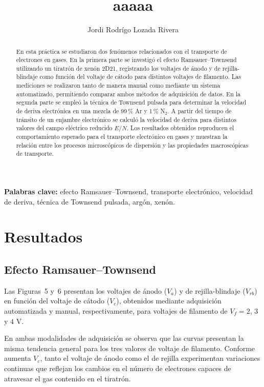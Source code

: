 \documentclass{article}
\title{aaaaa}
\author{Jordi Rodrígo Lozada Rivera}
\begin{document}
\begin{abstract}
En esta práctica se estudiaron dos fenómenos relacionados con el transporte de electrones en gases. En la primera parte se investigó el efecto Ramsauer--Townsend utilizando un tiratrón de xenón 2D21, registrando los voltajes de ánodo y de rejilla-blindaje como función del voltaje de cátodo para distintos voltajes de filamento. Las mediciones se realizaron tanto de manera manual como mediante un sistema automatizado, permitiendo comparar ambos métodos de adquisición de datos. En la segunda parte se empleó la técnica de Townsend pulsada para determinar la velocidad de deriva electrónica en una mezcla de 99\,\% Ar y 1\,\% N$_2$. A partir del tiempo de tránsito de un enjambre electrónico se calculó la velocidad de deriva para distintos valores del campo eléctrico reducido $E/N$. Los resultados obtenidos reproducen el comportamiento esperado para el transporte electrónico en gases y muestran la relación entre los procesos microscópicos de dispersión y las propiedades macroscópicas de transporte.
\end{abstract}

\vspace{0.3cm}

\textbf{Palabras clave:} efecto Ramsauer--Townsend, transporte electrónico, velocidad de deriva, técnica de Townsend pulsada, argón, xenón.


\section{Resultados}

\subsection{Efecto Ramsauer--Townsend}

Las Figuras~5 y~6 presentan los voltajes de ánodo ($V_a$) y de rejilla-blindaje ($V_{rb}$) en función del voltaje de cátodo ($V_c$), obtenidos mediante adquisición automatizada y manual, respectivamente, para voltajes de filamento de $V_f=2$, $3$ y $4$ V.

En ambas modalidades de adquisición se observa que las curvas presentan la misma tendencia general para los tres valores de voltaje de filamento. Conforme aumenta $V_c$, tanto el voltaje de ánodo como el de rejilla experimentan variaciones continuas que reflejan los cambios en el número de electrones capaces de atravesar el gas contenido en el tiratrón.
\end{document}
